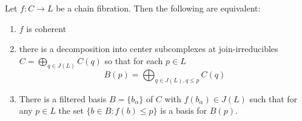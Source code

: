 \begin{thm}\label{thm:cfdecomp}
Let $f:C\to L$ be a chain fibration.  Then the following are equivalent:

\begin{enumerate}
\item $f$ is coherent


\item \label{thm:cfdecomp:JLDecomp} there is a decomposition into center subcomplexes at join-irreducibles $C= \bigoplus_{q\in J(L)} C(q)$ so that for each $p\in L$ $$B(p)= \bigoplus_{q\in J(L), q\leq p} C(q)$$ 

\item \label{thm:cfdecomp:basis} There is a filtered basis $B=\{b_\alpha\}$ of $C$ with $f(b_\alpha)\in J(L)$ such that for any $p\in L$ the set $\{b\in B: f(b)\leq p\}$ is a basis for $B(p)$.  


\end{enumerate}

\end{thm}
